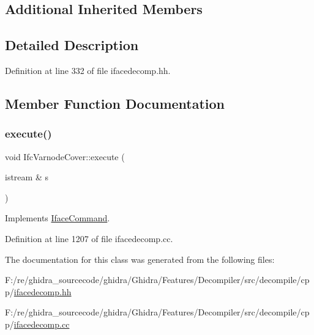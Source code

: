 \subsection*{Additional Inherited Members}


\subsection{Detailed Description}


Definition at line 332 of file ifacedecomp.\+hh.



\subsection{Member Function Documentation}
\mbox{\label{class_ifc_varnode_cover_aff6014b51215552ea689e3cde90b7e6c}} 
\subsubsection{\texorpdfstring{execute()}{execute()}}
{\footnotesize\ttfamily void Ifc\+Varnode\+Cover\+::execute (\begin{DoxyParamCaption}\item[{istream \&}]{s }\end{DoxyParamCaption})\hspace{0.3cm}{\ttfamily [virtual]}}



Implements \mbox{\hyperlink{class_iface_command_af10e29cee2c8e419de6efe9e680ad201}{Iface\+Command}}.



Definition at line 1207 of file ifacedecomp.\+cc.



The documentation for this class was generated from the following files\+:\begin{DoxyCompactItemize}
\item 
F\+:/re/ghidra\+\_\+sourcecode/ghidra/\+Ghidra/\+Features/\+Decompiler/src/decompile/cpp/\mbox{\hyperlink{ifacedecomp_8hh}{ifacedecomp.\+hh}}\item 
F\+:/re/ghidra\+\_\+sourcecode/ghidra/\+Ghidra/\+Features/\+Decompiler/src/decompile/cpp/\mbox{\hyperlink{ifacedecomp_8cc}{ifacedecomp.\+cc}}\end{DoxyCompactItemize}
